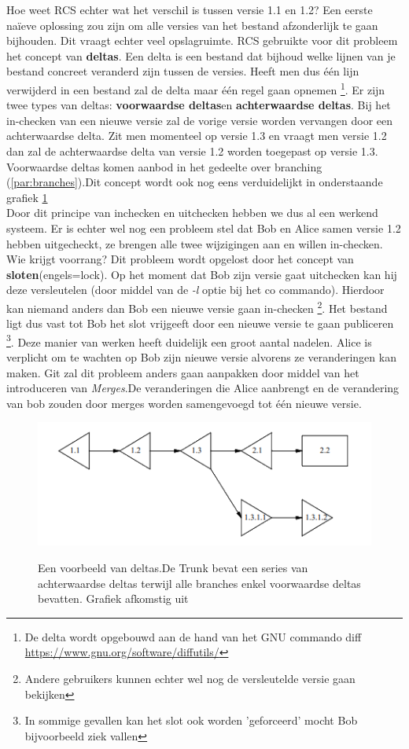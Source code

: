 Hoe weet RCS echter wat het verschil is tussen versie 1.1 en 1.2? Een eerste naïeve oplossing zou zijn om alle versies van het bestand afzonderlijk te gaan bijhouden. Dit vraagt echter veel opslagruimte. RCS gebruikte voor dit probleem het concept van \textbf{deltas}. Een delta is een bestand dat bijhoud welke lijnen van je bestand concreet veranderd zijn tussen de versies. Heeft men dus één lijn verwijderd in een bestand zal de delta maar één regel gaan opnemen \footnote{De delta wordt opgebouwd aan de hand van het GNU commando diff \url{https://www.gnu.org/software/diffutils/}}. Er zijn twee types van deltas: \textbf{voorwaardse deltas}en \textbf{achterwaardse deltas}. Bij het in-checken van een nieuwe versie zal de vorige versie worden vervangen door een achterwaardse  delta. Zit men momenteel op versie 1.3 en  vraagt men versie 1.2 dan zal de achterwaardse delta van versie 1.2 worden toegepast op versie 1.3. Voorwaardse deltas komen aanbod in het gedeelte over branching (\ref{par:branches}).Dit concept wordt ook nog eens verduidelijkt in onderstaande grafiek \ref{fig:deltas}\\

Door dit principe van inchecken en uitchecken hebben we dus al een werkend systeem. Er is echter wel nog een probleem stel dat Bob en Alice samen versie 1.2 hebben uitgecheckt, ze brengen alle twee wijzigingen aan en willen in-checken. Wie krijgt voorrang? Dit probleem wordt opgelost door het concept van \textbf{sloten}(engels=lock). Op het moment dat  Bob zijn versie gaat uitchecken kan hij deze versleutelen (door middel van de \textit{-l} optie bij het co commando). Hierdoor kan niemand anders dan Bob een nieuwe versie gaan in-checken \footnote{Andere gebruikers kunnen echter wel nog de versleutelde versie gaan bekijken}. Het bestand ligt dus vast tot Bob het slot vrijgeeft door een nieuwe versie te gaan publiceren \footnote{In sommige gevallen kan het slot ook worden 'geforceerd' mocht Bob bijvoorbeeld ziek vallen}. Deze manier van werken heeft duidelijk een groot aantal nadelen. Alice is verplicht om te wachten op Bob zijn nieuwe versie alvorens ze veranderingen kan maken. Git zal dit probleem anders gaan aanpakken door middel van het introduceren van \textit{Merges}.De veranderingen die Alice aanbrengt en de verandering van bob zouden door merges worden samengevoegd tot één nieuwe versie.\\

\label{par:branches}

\begin{figure}[h!]
\centering
  	\includegraphics[scale=1.0]{deltas.png}
	\label{fig:deltas}
\caption[Voorbeeld van deltas.]{Een voorbeeld van deltas.De Trunk bevat een series van achterwaardse deltas terwijl alle branches enkel voorwaardse deltas bevatten. Grafiek afkomstig uit \textcite{Tichy85rcs}}
\end{figure}
